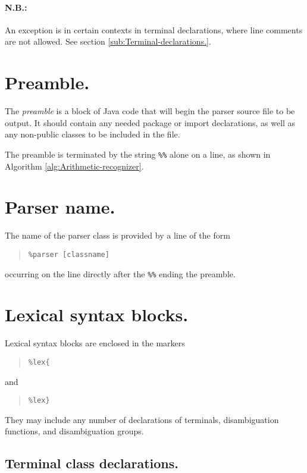 \documentclass[12pt,english,twoside]{report}
\begin{document}
\paragraph{N.B.:}

An exception is in certain contexts in terminal declarations, where
line comments are not allowed. See section \ref{sub:Terminal-declarations.}.


\section{Preamble.}

The \emph{preamble} is a block of Java code that will begin the parser
source file to be output. It should contain any needed package or
import declarations, as well as any non-public classes to be included
in the file.

The preamble is terminated by the string \texttt{\%\%} alone on a
line, as shown in Algorithm \ref{alg:Arithmetic-recognizer}.


\section{Parser name.}

The name of the parser class is provided by a line of the form

\begin{quote}
\texttt{\%parser {[}classname]}
\end{quote}
occurring on the line directly after the \texttt{\%\%} ending the
preamble.


\section{Lexical syntax blocks.}

Lexical syntax blocks are enclosed in the markers

\begin{quote}
\texttt{\%lex\{}
\end{quote}
and

\begin{quote}
\texttt{\%lex\}}
\end{quote}
They may include any number of declarations of terminals, disambiguation
functions, and disambiguation groups.


\subsection{Terminal class declarations.}
\end{document}
